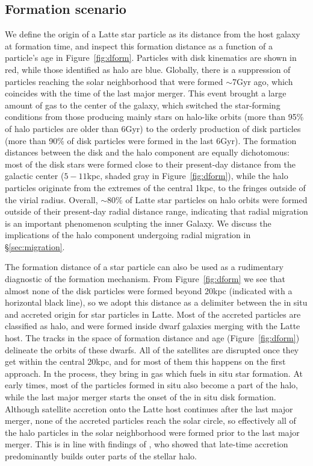 \documentclass[apj, twocolappendix, numberedappendix, appendixfloats]{emulateapj}
\begin{document}
\subsection{Formation scenario}
We define the origin of a Latte star particle as its distance from the host galaxy at formation time, and inspect this formation distance as a function of a particle's age in Figure~\ref{fig:dform}.
Particles with disk kinematics are shown in red, while those identified as halo are blue.
Globally, there is a suppression of particles reaching the solar neighborhood that were formed $\sim$7\;Gyr ago, which coincides with the time of the last major merger.
This event brought a large amount of gas to the center of the galaxy, which switched the star-forming conditions from those producing mainly stars on halo-like orbits (more than 95\% of halo particles are older than 6\;Gyr) to the orderly production of disk particles (more than 90\% of disk particles were formed in the last 6\;Gyr).
The formation distances between the disk and the halo component are equally dichotomous: most of the disk stars were formed close to their present-day distance from the galactic center ($5-11$\;kpc, shaded gray in Figure~\ref{fig:dform}), while the halo particles originate from the extremes of the central 1\;kpc, to the fringes outside of the virial radius.
Overall, $\sim80$\% of Latte star particles on halo orbits were formed outside of their present-day radial distance range, indicating that radial migration is an important phenomenon sculpting the inner Galaxy.
We discuss the implications of the halo component undergoing radial migration in \S\ref{sec:migration}.

The formation distance of a star particle can also be used as a rudimentary diagnostic of the formation mechanism.
From Figure~\ref{fig:dform} we see that almost none of the disk particles were formed beyond 20\;kpc (indicated with a horizontal black line), so we adopt this distance as a delimiter between the in situ and accreted origin for star particles in Latte.
Most of the accreted particles are classified as halo, and were formed inside dwarf galaxies merging with the Latte host.
The tracks in the space of formation distance and age (Figure~\ref{fig:dform}) delineate the orbits of these dwarfs.
All of the satellites are disrupted once they get within the central 20\;kpc, and for most of them this happens on the first approach.
In the process, they bring in gas which fuels in situ star formation.
At early times, most of the particles formed in situ also become a part of the halo, while the last major merger starts the onset of the in situ disk formation.
Although satellite accretion onto the Latte host continues after the last major merger, none of the accreted particles reach the solar circle, so effectively all of the halo particles in the solar neighborhood were formed prior to the last major merger.
This is in line with findings of \citet{zolotov2009}, who showed that late-time accretion predominantly builds outer parts of the stellar halo.
\end{document}
